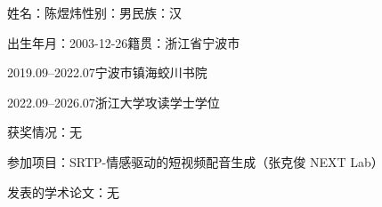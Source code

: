 \cleardoublepage
\setlength{\parindent}{0em}


\par 姓名：陈煜炜\quad 性别：男\quad 民族：汉

\par 出生年月：2003-12-26\quad 籍贯：浙江省宁波市

\par 2019.09--2022.07\quad 宁波市镇海蛟川书院

\par 2022.09--2026.07\quad 浙江大学攻读学士学位

\par 获奖情况：无

\par 参加项目：SRTP-情感驱动的短视频配音生成（张克俊 NEXT Lab）

\par 发表的学术论文：无
